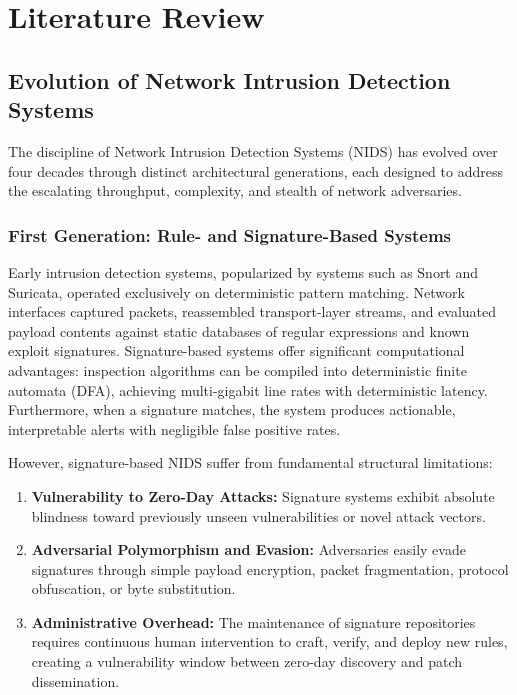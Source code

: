 \documentclass[12pt,a4paper,oneside]{report}
\begin{document}
\chapter{Literature Review}
\label{chap:lit_review}

\section{Evolution of Network Intrusion Detection Systems}
The discipline of Network Intrusion Detection Systems (NIDS) has evolved over four decades through distinct architectural generations, each designed to address the escalating throughput, complexity, and stealth of network adversaries.

\subsection{First Generation: Rule- and Signature-Based Systems}
Early intrusion detection systems, popularized by systems such as Snort and Suricata, operated exclusively on deterministic pattern matching. Network interfaces captured packets, reassembled transport-layer streams, and evaluated payload contents against static databases of regular expressions and known exploit signatures. Signature-based systems offer significant computational advantages: inspection algorithms can be compiled into deterministic finite automata (DFA), achieving multi-gigabit line rates with deterministic latency. Furthermore, when a signature matches, the system produces actionable, interpretable alerts with negligible false positive rates.

However, signature-based NIDS suffer from fundamental structural limitations:
\begin{enumerate}
    \item \textbf{Vulnerability to Zero-Day Attacks:} Signature systems exhibit absolute blindness toward previously unseen vulnerabilities or novel attack vectors.
    \item \textbf{Adversarial Polymorphism and Evasion:} Adversaries easily evade signatures through simple payload encryption, packet fragmentation, protocol obfuscation, or byte substitution.
    \item \textbf{Administrative Overhead:} The maintenance of signature repositories requires continuous human intervention to craft, verify, and deploy new rules, creating a vulnerability window between zero-day discovery and patch dissemination.
\end{enumerate}
\end{document}
